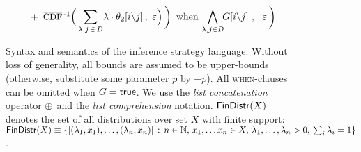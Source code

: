 \begin{figure}
\begin{gather*}
{          \ + \
          \InvCCDF\Bigl(\,
            \sum_{\lambda, j \,\in\, D} \! {\lambda \cdot \FSubst{\theta_2}{i}{j} }
            \,, \,\, \varepsilon \Bigl)
        \, \biggr)
        \, \WhenSymbBE
        \bigwedge_{\lambda, j \in D} \!\! \FSubst{G}{i}{j}
        \ , \ \ \Eps
      \,\biggr)
    \ }
  \end{gather*}
  \Description[]{}
  \caption{Syntax and semantics of the inference strategy language. Without loss of generality, all bounds are assumed to be upper-bounds (otherwise, substitute some parameter $p$ by $-p$). All \textsc{when}-clauses can be omitted when $G=\mathsf{true}$. We use the \emph{list concatenation} operator $\operatorname{\oplus}$ and the \emph{list comprehension} notation. $\mathsf{FinDistr}(X)$ denotes the set of all distributions over set $X$ with finite support: $\mathsf{FinDistr}(X) \equiv \{[(\lambda_1, x_1), \dots, (\lambda_n, x_n)] \,:\, n \in \mathbb{N}, \, x_1, \dots x_n \in X, \, \lambda_1, \dots, \lambda_n > 0, \, \sum_i \lambda_i = 1 \}$.}\label{fig:inf-lang-syntax-semantics}
\end{figure}

